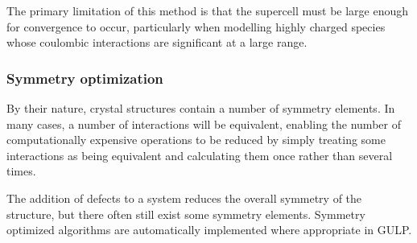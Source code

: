 The primary limitation of this method is that the supercell must be large enough for convergence to occur, particularly when modelling highly charged species whose coulombic interactions are significant at a large range.

\subsubsection{Symmetry optimization}
By their nature, crystal structures contain a number of symmetry elements.
In many cases, a number of interactions will be equivalent, enabling the number of computationally expensive operations to be reduced by simply treating some interactions as being equivalent and calculating them once rather than several times.

The addition of defects to a system reduces the overall symmetry of the structure, but there often still exist some symmetry elements.
Symmetry optimized algorithms are automatically implemented where appropriate in GULP.

\newpage

